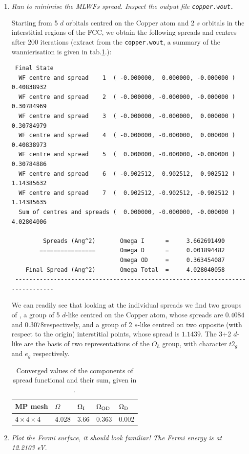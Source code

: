 \begin{enumerate}
	\item {\it Run \Wannier{} to minimise the MLWFs spread. Inspect the output file {\tt copper.wout.}}

	Starting from 5 $d$ orbitals centred on the Copper atom and 2 $s$ orbitals in the interstitial regions of the FCC, we obtain the following spreads and centres after 200 iterations (extract from the {\tt copper.wout}, a summary of the wannierisation is given in tab.\ref{tab4.1}.):
	\begin{tcolorbox}[sharp corners,boxrule=0.5pt]
	{\small
	\begin{verbatim}
 Final State
  WF centre and spread    1  ( -0.000000,  0.000000, -0.000000 )     0.40838932
  WF centre and spread    2  ( -0.000000, -0.000000, -0.000000 )     0.30784969
  WF centre and spread    3  ( -0.000000, -0.000000,  0.000000 )     0.30784979
  WF centre and spread    4  ( -0.000000, -0.000000,  0.000000 )     0.40838973
  WF centre and spread    5  (  0.000000, -0.000000, -0.000000 )     0.30784886
  WF centre and spread    6  ( -0.902512,  0.902512,  0.902512 )     1.14385632
  WF centre and spread    7  (  0.902512, -0.902512, -0.902512 )     1.14385635
  Sum of centres and spreads (  0.000000, -0.000000, -0.000000 )     4.02804006

         Spreads (Ang^2)       Omega I      =     3.662691490
        ================       Omega D      =     0.001894482
                               Omega OD     =     0.363454087
    Final Spread (Ang^2)       Omega Total  =     4.028040058
 ------------------------------------------------------------------------------
	\end{verbatim}
	}
	\end{tcolorbox}
	We can readily see that looking at the individual spreads we find two groups of \MLWFs, a group of 5 $d$-like \MLWFs{} centred on the Copper atom, whose spreads are $0.4084$\angsqd and $0.3078$\angsqd respectively, and a group of 2 $s$-like \MLWFs{} centred on two opposite (with respect to the origin) interstitial points, whose spread is $1.1439$\angsqd. The 3+2 $d$-like \MLWFs{} are the basis of two representations of the $O_h$ group, with character $t2_g$ and $e_g$ respectively.
	\begin{table}[b!]
	\centering
	\caption{Converged values of the components of spread functional and their sum, given in \angsqd{}.}
	\begin{tabular}{@{} lllll @{}}\toprule[1.5pt]
	MP mesh & $\Omega$ & $\Omega\tinysub{I}$ & $\Omega\tinysub{OD}$ & $\Omega\tinysub{D}$ \\\midrule
	$4\times4\times4$ & 4.028 & 3.66 & 0.363 & 0.002 \\\bottomrule[1pt]
	\end{tabular}\label{tab4.1}
	\end{table}
	\item {\it Plot the Fermi surface, it should look familiar! The Fermi energy is at 12.2103 eV.}


\end{enumerate}
